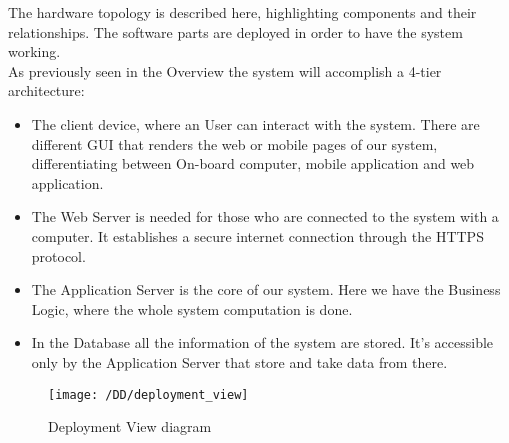 The hardware topology is described here, highlighting components and their relationships. The software parts are deployed in order to have the system working.
\\As previously seen in the Overview the system will accomplish a 4-tier architecture:
\begin{itemize}
	\item{The client device, where an User can interact with the system. There are different GUI that renders the web or mobile pages of our system, differentiating between On-board computer, mobile application and web application.}
	\item{ The Web Server is needed for those who are connected to the system with a computer. It establishes a secure internet connection through the HTTPS protocol.}
	\item{The Application Server is the core of our system. Here we have the Business Logic, where the whole system computation is done.}
	\item{In the Database all the information of the system are stored. It's accessible only by the Application Server that store and take data from there.}
\end{itemize} 

\begin{figure}[!ht]
  \centering
  \vspace{0.1cm}
  \texttt{[image: /DD/deployment\_view]}\\
  \vspace{0.1cm}
  \caption{Deployment View diagram} 
  \label{fig:DeploymentView} 
\end{figure}
